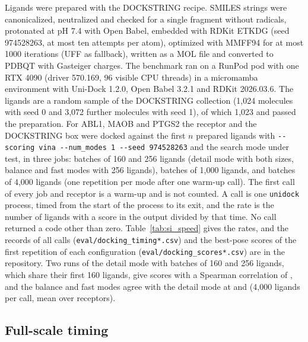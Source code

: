 \documentclass[journal=jcisd8,manuscript=article]{achemso}
\begin{document}
Ligands were prepared with the DOCKSTRING recipe. SMILES strings were canonicalized, neutralized and checked for a single fragment without radicals, protonated at pH 7.4 with Open Babel, embedded with RDKit ETKDG (seed 974528263, at most ten attempts per atom), optimized with MMFF94 for at most 1000 iterations (UFF as fallback), written as a MOL file and converted to PDBQT with Gasteiger charges. The benchmark ran on a RunPod pod with one RTX 4090 (driver 570.169, 96 visible CPU threads) in a micromamba environment with Uni-Dock 1.2.0, Open Babel 3.2.1 and RDKit 2026.03.6. The ligands are a random sample of the DOCKSTRING collection (1,024 molecules with seed 0 and 3,072 further molecules with seed 1), of which 1,023 and \dockPrepOkFourK{} passed the preparation. For ABL1, MAOB and PTGS2 the receptor and the DOCKSTRING box were docked against the first $n$ prepared ligands with \texttt{-{}-scoring vina -{}-num\_modes 1 -{}-seed 974528263} and the search mode under test, in three jobs: batches of 160 and 256 ligands (detail mode with both sizes, balance and fast modes with 256 ligands), batches of 1,000 ligands, and batches of 4,000 ligands (one repetition per mode after one warm-up call). The first call of every job and receptor is a warm-up and is not counted. A call is one \texttt{unidock} process, timed from the start of the process to its exit, and the rate is the number of ligands with a score in the output divided by that time. No call returned a code other than zero. Table~\ref{tab:si_speed} gives the rates, and the records of all calls (\texttt{eval/docking\_timing*.csv}) and the best-pose scores of the first repetition of each configuration (\texttt{eval/docking\_scores*.csv}) are in the repository. Two runs of the detail mode with batches of 160 and 256 ligands, which share their first 160 ligands, give scores with a Spearman correlation of \dockAgreeDetail{}, and the balance and fast modes agree with the detail mode at \dockAgreeBal{} and \dockAgreeFast{} (4,000 ligands per call, mean over receptors).

\subsection{Full-scale timing}
\end{document}
